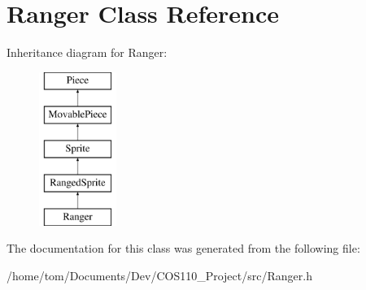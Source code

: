 \hypertarget{classRanger}{\section{Ranger Class Reference}
\label{classRanger}
}
Inheritance diagram for Ranger\-:\begin{figure}[H]
\begin{center}
\leavevmode
\includegraphics[height=5.000000cm]{classRanger}
\end{center}
\end{figure}


The documentation for this class was generated from the following file\-:\begin{DoxyCompactItemize}
\item 
/home/tom/\-Documents/\-Dev/\-C\-O\-S110\-\_\-\-Project/src/Ranger.\-h\end{DoxyCompactItemize}
